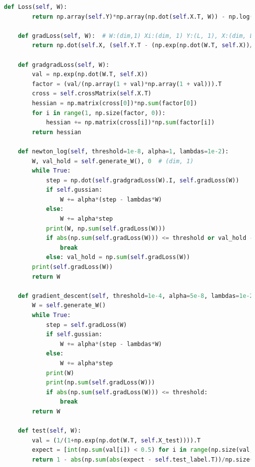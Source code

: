 \documentclass{article}
\begin{document}
\begin{lstlisting}[language={Python},title={hyperparams.py}]
    def Loss(self, W):
        return np.array(self.Y)*np.array(np.dot(self.X.T, W)) - np.log(1 + np.exp(np.dot(W.T, self.X))).T

    def gradLoss(self, W):  # W:(dim,1) Xi:(dim, 1) Y:(L, 1), X:(dim, L )
        return np.dot(self.X, (self.Y.T - (np.exp(np.dot(W.T, self.X))/(1 + np.exp(np.dot(W.T, self.X))))).T)

    def gradgradLoss(self, W):
        val = np.exp(np.dot(W.T, self.X))
        factor = (val/(np.array(1 + val)*np.array(1 + val))).T
        cross = self.crossMatrix(self.X.T)
        hessian = np.matrix(cross[0])*np.sum(factor[0])
        for i in range(1, np.size(factor, 0)):
            hessian += np.matrix(cross[i])*np.sum(factor[i])
        return hessian

    def newton_log(self, threshold=1e-8, alpha=1, lambdas=1e-2):
        W, val_hold = self.generate_W(), 0  # (dim, 1)
        while True:
            step = np.dot(self.gradgradLoss(W).I, self.gradLoss(W))
            if self.gussian:
                W += alpha*(step - lambdas*W)
            else:
                W += alpha*step
            print(W, np.sum(self.gradLoss(W)))
            if abs(np.sum(self.gradLoss(W))) <= threshold or val_hold - np.sum(self.gradLoss(W)) < 1e-5:
                break
            else: val_hold = np.sum(self.gradLoss(W))
        print(self.gradLoss(W))
        return W

    def gradient_descent(self, threshold=1e-4, alpha=5e-8, lambdas=1e-2):
        W = self.generate_W()
        while True:
            step = self.gradLoss(W)
            if self.gussian:
                W += alpha*(step - lambdas*W)
            else:
                W += alpha*step
            print(W)
            print(np.sum(self.gradLoss(W)))
            if abs(np.sum(self.gradLoss(W))) <= threshold:
                break
        return W

    def test(self, W):
        val = (1/(1+np.exp(np.dot(W.T, self.X_test)))).T
        expect = [int(np.sum(val[i]) < 0.5) for i in range(np.size(val, 0))]
        return 1 - abs(np.sum(abs(expect - self.test_label.T))/np.size(val, 0))


\end{lstlisting}
\end{document}
